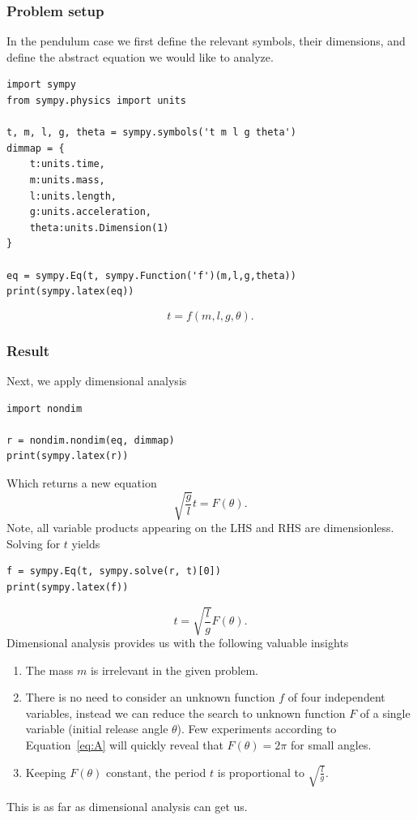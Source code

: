 \documentclass[11pt]{article}
\begin{document}
\subsubsection{Problem setup}
In the pendulum case we first define the relevant symbols, their dimensions, and define the abstract equation we would like to analyze.
\begin{verbatim}
import sympy
from sympy.physics import units

t, m, l, g, theta = sympy.symbols('t m l g theta')
dimmap = {
    t:units.time, 
    m:units.mass, 
    l:units.length, 
    g:units.acceleration, 
    theta:units.Dimension(1)
}

eq = sympy.Eq(t, sympy.Function('f')(m,l,g,theta))
print(sympy.latex(eq))
\end{verbatim}
$$t = f{\left(m,l,g,\theta \right)}.$$

\subsubsection{Result}
Next, we apply dimensional analysis
\begin{verbatim}
import nondim

r = nondim.nondim(eq, dimmap)
print(sympy.latex(r))
\end{verbatim}
Which returns a new equation
\begin{equation}
    \sqrt{\frac{g}{l}}t = F{\left(\theta \right)}. \label{eq:A}
\end{equation} Note, all variable products appearing on the LHS and RHS are dimensionless. Solving for $t$ yields
\begin{verbatim}
f = sympy.Eq(t, sympy.solve(r, t)[0])
print(sympy.latex(f))
\end{verbatim}
$$t = \sqrt{\frac{l}{g}}F{\left(\theta \right)}.$$ 
Dimensional analysis provides us with the following valuable insights
\begin{enumerate}
    \item The mass $m$ is irrelevant in the given problem.
    \item There is no need to consider an unknown function $f$ of four independent variables, instead we can reduce the search to unknown function $F$ of a single variable (initial release angle $\theta$). Few experiments according to Equation~\ref{eq:A} will quickly reveal that $F(\theta)=2\pi$ for small angles.
    \item Keeping $F{\left(\theta \right)}$ constant, the period $t$ is proportional to $\sqrt{\frac{l}{g}}$.
\end{enumerate}
This is as far as dimensional analysis can get us. 
\end{document}
